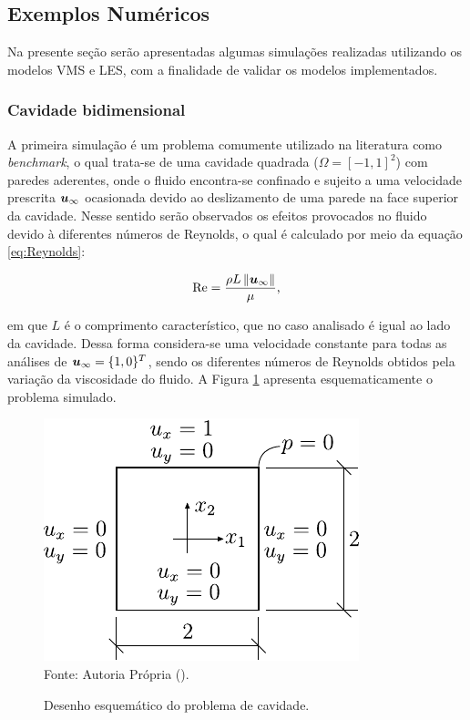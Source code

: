 \subsection{Exemplos Numéricos} \label{ExemplosMT}

Na presente seção serão apresentadas algumas simulações realizadas utilizando os modelos VMS e LES, com a finalidade de validar os modelos implementados.

\subsubsection{Cavidade bidimensional}

A primeira simulação é um problema comumente utilizado na literatura como \textit{benchmark}, o qual trata-se de uma cavidade quadrada ($\Omega=[-1,1]^2$) com paredes aderentes, onde o fluido encontra-se confinado e sujeito a uma velocidade prescrita $\boldsymbol{u}_\infty$ ocasionada devido ao deslizamento de uma parede na face superior da cavidade. Nesse sentido serão observados os efeitos provocados no fluido devido à diferentes números de Reynolds, o qual é calculado por meio da equação \ref{eq:Reynolds}:

\begin{equation}
    \mathrm{Re}=\frac{\rho L\left\lVert{\boldsymbol{u}_\infty}\right\lVert}{\mu}\text{,}
    \label{eq:Reynolds}
\end{equation}

\noindent em que $L$ é o comprimento característico, que no caso analisado é igual ao lado da cavidade. Dessa forma considera-se uma velocidade constante para todas as análises de $\boldsymbol{u}_\infty=\{1,0\}^T$, sendo os diferentes números de Reynolds obtidos pela variação da viscosidade do fluido. A Figura \ref{fig:cavity} apresenta esquematicamente o problema simulado.

\begin{figure}[h!]
    \centering
    \caption{Desenho esquemático do problema de cavidade.}
    \includegraphics[width=.35\linewidth]{Figuras/Cavity/cavidade.pdf}
    \\Fonte: Autoria Própria (\the\year).
    \label{fig:cavity}
\end{figure}

